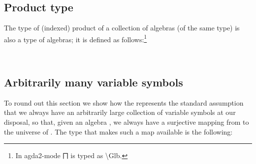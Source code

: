 \documentclass[a4paper,USenglish,cleveref,autoref,thm-restate]{lipics-v2019}
\begin{document}
\subsection{Product type}
The type of (indexed) product of a collection of algebras (of the same type) is also a type of algebras; it is defined as follows:\footnote{In agda2-mode ⨅ is typed as \textbackslash Glb.}
\begin{code}%
\>[1]\AgdaSpace{}%
\AgdaSymbol{:}\AgdaSpace{}%
\AgdaSymbol{\{}\AgdaSpace{}%
\AgdaSymbol{:}\AgdaSpace{}%
\AgdaSpace{}%
\AgdaSpace{}%
\AgdaSymbol{\}(}\AgdaSpace{}%
\AgdaSymbol{:}\AgdaSpace{}%
\AgdaSpace{}%
\AgdaSpace{}%
\AgdaSpace{}%
\AgdaSpace{}%
\AgdaSpace{}%
\AgdaSymbol{)}\AgdaSpace{}%
\AgdaSpace{}%
\AgdaSpace{}%
\AgdaSymbol{(}\AgdaSpace{}%
\AgdaSpace{}%
\AgdaSymbol{)}\AgdaSpace{}%
\<%
\\
%
\>[1]\AgdaSpace{}%
\AgdaSpace{}%
\AgdaSymbol{=}%
\>[8]\AgdaSymbol{((}\AgdaSpace{}%
\AgdaSymbol{:}\AgdaSpace{}%
\AgdaSymbol{\AgdaUnderscore{})}\AgdaSpace{}%
\AgdaSpace{}%
\AgdaSpace{}%
\AgdaSpace{}%
\AgdaSpace{}%
\AgdaSymbol{)}\AgdaSpace{}%
\AgdaOperator{\AgdaInductiveConstructor{,}}%
\>[31]\AgdaSpace{}%
\AgdaSpace{}%
\AgdaSpace{}%
\AgdaSpace{}%
\AgdaSpace{}%
\AgdaSymbol{(}\AgdaSpace{}%
\AgdaSpace{}%
\AgdaSpace{}%
\AgdaSymbol{)}\AgdaSpace{}%
\AgdaSpace{}%
\AgdaSpace{}%
\AgdaSpace{}%
\AgdaSpace{}%
\AgdaSpace{}%
\<%
\end{code}

\subsection{Arbitrarily many variable symbols}
To round out this section we show how the \agdaualib represents the standard assumption that we always have an arbitrarily large collection  of variable symbols at our disposal, so that, given an algebra , we always have a surjective mapping from  to the universe \AgdaSpace{}\AgdaSpace{} of . The type that makes such a map available is the following:
\end{document}
